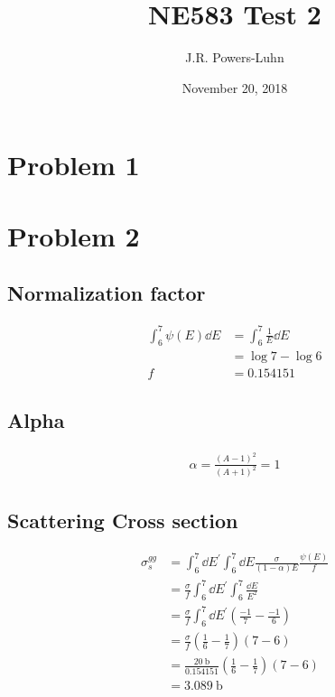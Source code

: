 \documentclass{article}
\title{NE583 Test 2}
\author{J.R. Powers-Luhn}
\date{November 20, 2018}
\begin{document}
\maketitle

\section{Problem 1}

\section{Problem 2}

\subsection{Normalization factor}

\begin{align*}
\int_6^7 \psi(E) \dd{E} &= \int_6^7 \frac{1}{E} \dd{E} \\
&= \log{7} - \log{6} \\
f &= 0.154151
\end{align*}

\subsection{Alpha}

\begin{align*}
\alpha = \frac{(A-1)^2}{(A+1)^2} = 1
\end{align*}

\subsection{Scattering Cross section}

\begin{align*}
\sigma_s^{gg} &= \int_6^7 \dd{E^\prime} \int_6^7 \dd{E} \frac{\sigma}{(1 - \alpha)E} \frac{\psi(E)}{f} \\
&= \frac{\sigma}{f} \int_6^7 \dd{E^\prime} \int_6^7 \frac{\dd{E}}{E^2} \\
&= \frac{\sigma}{f} \int_6^7 \dd{E^\prime} \left( \frac{-1}{7} - \frac{-1}{6} \right) \\
&= \frac{\sigma}{f} \left( \frac{1}{6} - \frac{1}{7} \right) \left( 7 - 6 \right) \\
&= \frac{\SI{20}{\barn}}{0.154151} \left( \frac{1}{6} - \frac{1}{7} \right) \left( 7 - 6 \right) \\
&= \SI{3.089}{\barn}
\end{align*}
\end{document}
